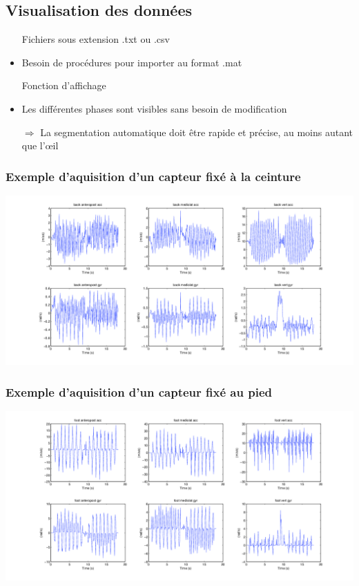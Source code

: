 \documentclass{beamer}
\begin{document}
\subsection{Visualisation des données}
\begin{frame}

\begin{itemize}

\item[Fichiers] sous extension .txt ou .csv
\item Besoin de procédures pour importer au format .mat

\item[Fonction] d'affichage
\item Les différentes phases sont visibles sans besoin de modification

\item[$\Longrightarrow$] La segmentation automatique doit être rapide et précise, au moins autant que l'œil

\end{itemize}

\end{frame}

\begin{frame}
\frametitle{Exemple d'aquisition d'un capteur fixé à la ceinture}
\hspace*{-2.8cm}\includegraphics[scale=0.4]{examplevisuback}

\end{frame}

\begin{frame}
\frametitle{Exemple d'aquisition d'un capteur fixé au pied}
\hspace*{-2.8cm}\includegraphics[scale=0.4]{examplevisufoot}

\end{frame}
\end{document}

